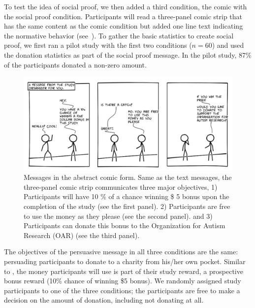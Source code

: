 To test the idea of social proof, we then added a third condition, the comic with the social proof condition. Participants will read a three-panel comic strip that has the same content as the comic condition but added one line text indicating the normative behavior (see~). To gather the basic statistics to create social proof, we first ran a pilot study with the first two conditions ($n=60$) and used the donation statistics as part of the social proof message. In the pilot study, 87\% of the participants donated a non-zero amount. 

\begin{figure}[bt]
    \centering
    \includegraphics[width=\columnwidth]{./figures/abstract_comic.png}
    \caption{Messages in the abstract comic form. Same as the text messages, the three-panel comic strip communicates three major objectives, 1) Participants will have 10 \% of a chance winning \$ 5 bonus upon the completion of the study (see the first panel). 2) Participants are free to use the money as they please (see the second panel). and 3) Participants can donate this bonus to the Organization for Autism Research (OAR) (see the third panel).}
    \label{fig:basic three comic panel}
\end{figure}

The objectives of the persuasive message in all three conditions are the same: persuading participants to donate to a charity from his/her own pocket. Similar to \textcite{lee2013does}, the money participants will use is part of their study reward, a prospective bonus reward (10\% chance of winning \$5 bonus). We randomly assigned study participants to one of the three conditions; the participants are free to make a decision on the amount of donation, including not donating at all.

